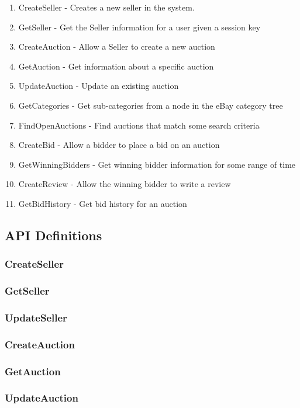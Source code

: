 \documentclass[12pt,a4paper]{article}
\begin{document}
\begin{enumerate}
	\item CreateSeller - Creates a new seller in the system.
	\item GetSeller - Get the Seller information for a user given a session key
	\item CreateAuction - Allow a Seller to create a new auction
	\item GetAuction - Get information about a specific auction
	\item UpdateAuction - Update an existing auction
	\item GetCategories - Get sub-categories from a node in the eBay category tree
	\item FindOpenAuctions - Find auctions that match some search criteria
	\item CreateBid - Allow a bidder to place a bid on an auction
	\item GetWinningBidders - Get winning bidder information for some range of time
	\item CreateReview - Allow the winning bidder to write a review
	\item GetBidHistory - Get bid history for an auction
\end{enumerate}


\subsection{API Definitions}
\subsubsection{CreateSeller}
\subsubsection{GetSeller}
\subsubsection{UpdateSeller}
\subsubsection{CreateAuction}
\subsubsection{GetAuction}
\subsubsection{UpdateAuction}
\end{document}
